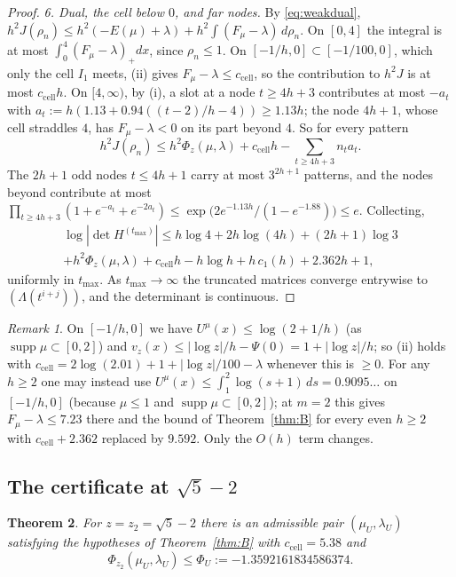 \documentclass[11pt]{amsart}
\newtheorem{theorem}{Theorem}[section]
\theoremstyle{definition}
\theoremstyle{remark}
\newtheorem{remark}[theorem]{Remark}
\numberwithin{equation}{section}
\newcommand{\ccell}{c_{\mathrm{cell}}}
\begin{document}
\begin{proof}
\emph{6. Dual, the cell below $0$, and far nodes.} By \eqref{eq:weakdual},
$h^2J(\rho_n)\le h^2(-E(\mu)+\lambda)+h^2\int(F_\mu-\lambda)\,d\rho_n$. On $[0,4]$ the integral is at most
$\int_0^4(F_\mu-\lambda)_+dx$, since $\rho_n\le1$. On $[-1/h,0]\subset[-1/100,0]$, which only the cell $I_1$ meets, (ii)
gives $F_\mu-\lambda\le\ccell$, so the contribution to $h^2J$ is at most $\ccell h$. On $[4,\infty)$, by (i), a slot at a
node $t\ge4h+3$ contributes at most $-a_t$ with $a_t:=h(1.13+0.94((t-2)/h-4))\ge1.13h$; the node $4h+1$, whose cell
straddles $4$, has $F_\mu-\lambda<0$ on its part beyond $4$. So for every pattern
\[
  h^2J(\rho_n)\le h^2\Phi_z(\mu,\lambda)+\ccell h-\sum_{t\ge4h+3}n_ta_t .
\]
The $2h+1$ odd nodes $t\le4h+1$ carry at most $3^{2h+1}$ patterns, and the nodes beyond contribute at most
$\prod_{t\ge4h+3}(1+e^{-a_t}+e^{-2a_t})\le\exp\bigl(2e^{-1.13h}/(1-e^{-1.88})\bigr)\le e$. Collecting,
\begin{multline*}
  \log|\det H^{(t_{\max})}|\le h\log4+2h\log(4h)+(2h+1)\log3\\
  +h^2\Phi_z(\mu,\lambda)+\ccell h-h\log h+h\,c_1(h)+2.362h+1,
\end{multline*}
uniformly in $t_{\max}$. As $t_{\max}\to\infty$ the truncated matrices converge entrywise to $(\Lambda(t^{i+j}))$, and
the determinant is continuous.
\end{proof}

\begin{remark}
On $[-1/h,0]$ we have $U^\mu(x)\le\log(2+1/h)$ (as $\operatorname{supp}\mu\subset[0,2]$) and $v_z(x)\le|\log z|/h-\Psi(0)
=1+|\log z|/h$; so (ii) holds with $\ccell=2\log(2.01)+1+|\log z|/100-\lambda$ whenever this is $\ge0$. For any $h\ge2$
one may instead use $U^\mu(x)\le\int_1^2\log(s+1)\,ds=0.9095\ldots$ on $[-1/h,0]$ (because $\mu\le1$ and
$\operatorname{supp}\mu\subset[0,2]$); at $m=2$ this gives $F_\mu-\lambda\le7.23$ there and the bound of
Theorem~\ref{thm:B} for every even $h\ge2$ with $\ccell+2.362$ replaced by $9.592$. Only the $O(h)$ term changes.
\end{remark}

\subsection{The certificate at \texorpdfstring{$\sqrt5-2$}{sqrt5 - 2}}\label{sec:cert}

\begin{theorem}\label{thm:cert}
For $z=z_2=\sqrt5-2$ there is an admissible pair $(\mu_U,\lambda_U)$ satisfying the hypotheses of Theorem~\ref{thm:B}
with $\ccell=5.38$ and
\[
  \Phi_{z_2}(\mu_U,\lambda_U)\le\Phi_U:=-1.3592161834586374 .
\]
\end{theorem}
\end{document}
